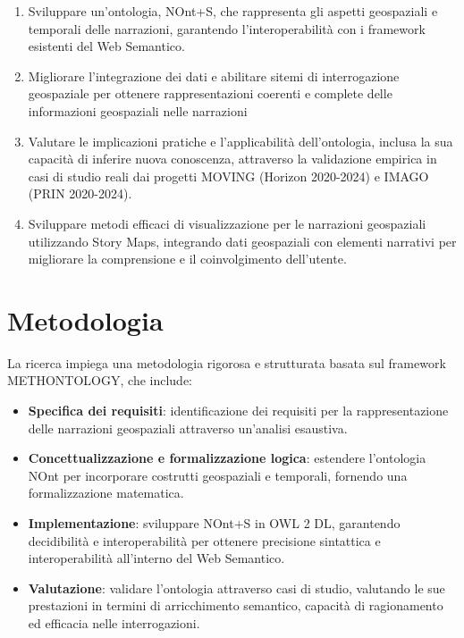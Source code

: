 \begin{enumerate}
    \item Sviluppare un'ontologia, NOnt+S, che rappresenta gli aspetti geospaziali e temporali delle narrazioni, garantendo l'interoperabilità con i framework esistenti del Web Semantico.
    \item Migliorare l'integrazione dei dati e abilitare sitemi di interrogazione geospaziale per ottenere rappresentazioni coerenti e complete delle informazioni geospaziali nelle narrazioni
    \item Valutare le implicazioni pratiche e l'applicabilità dell'ontologia, inclusa la sua capacità di inferire nuova conoscenza, attraverso la validazione empirica in casi di studio reali dai progetti MOVING (Horizon 2020-2024) e IMAGO (PRIN 2020-2024).
    \item Sviluppare metodi efficaci di visualizzazione per le narrazioni geospaziali utilizzando Story Maps, integrando dati geospaziali con elementi narrativi per migliorare la comprensione e il coinvolgimento dell'utente.
\end{enumerate}

\section*{Metodologia}

La ricerca impiega una metodologia rigorosa e strutturata basata sul framework METHONTOLOGY, che include:

\begin{itemize}
    \item \textbf{Specifica dei requisiti}: identificazione dei requisiti per la rappresentazione delle narrazioni geospaziali attraverso un'analisi esaustiva.
    \item \textbf{Concettualizzazione e formalizzazione logica}: estendere l'ontologia NOnt per incorporare costrutti geospaziali e temporali, fornendo una formalizzazione matematica.
    \item \textbf{Implementazione}: sviluppare NOnt+S in OWL 2 DL, garantendo decidibilità e interoperabilità per ottenere precisione sintattica e interoperabilità all'interno del Web Semantico.
    \item \textbf{Valutazione}: validare l'ontologia attraverso casi di studio, valutando le sue prestazioni in termini di arricchimento semantico, capacità di ragionamento ed efficacia nelle interrogazioni.
\end{itemize}

